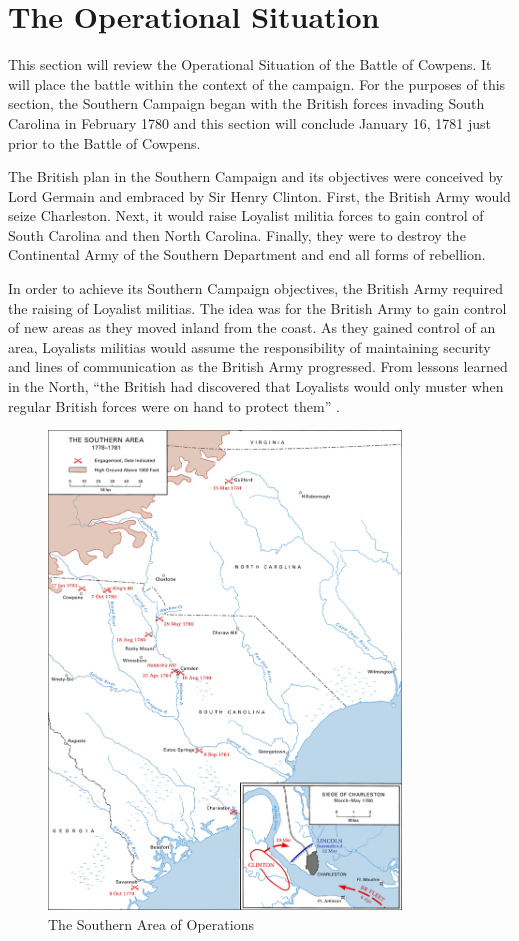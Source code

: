 \section{The Operational Situation}

This section will review the Operational Situation of the Battle of Cowpens.  It
will place the battle within the context of the campaign.   For the purposes of
this section, the Southern Campaign began with the British forces invading South
Carolina in February 1780 and this section will conclude January 16, 1781 just
prior to the Battle of Cowpens.

The British plan in the Southern Campaign and its objectives were conceived by
Lord Germain and embraced by Sir Henry Clinton.  First, the British Army would
seize Charleston.  Next, it would raise Loyalist militia forces to gain control
of South Carolina and then North Carolina.  Finally, they were to destroy the
Continental Army of the Southern Department and end all forms of rebellion.

In order to achieve its Southern Campaign objectives, the British Army required
the raising of Loyalist militias.  The idea was for the British Army to gain
control of new areas as they moved inland from the coast.  As they gained
control of an area, Loyalists militias would assume the responsibility of
maintaining security and lines of communication as the British Army progressed.
From lessons learned in the North, “the British had discovered that Loyalists
would only muster when regular British forces were on hand to protect them”
\cite[p.43]{woodward_comparative_2002}.

\begin{figure}[h]
\begin{center}
\includegraphics[height=5in]{gfx/Nicholson1}
\end{center}
\caption{The Southern Area of Operations \cite[Map 10, p. 91]{stewart_2005}}
\label{Nicholson1}
\end{figure}


